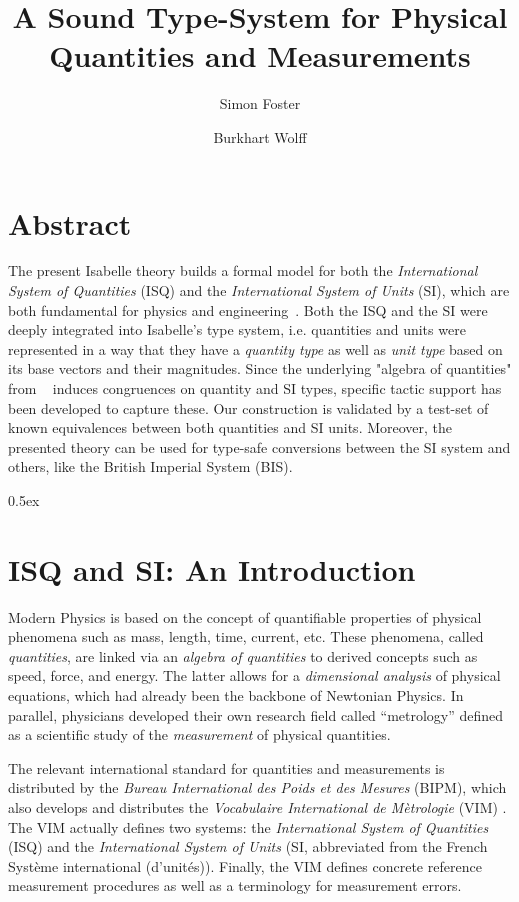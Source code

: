 \documentclass[11pt,a4paper]{book}
\begin{document}
\title{A Sound Type-System for Physical Quantities and Measurements}
\author{Simon Foster \and Burkhart Wolff}
\maketitle

\chapter*{Abstract}
The present Isabelle theory builds a formal model for both the \emph{International System of Quantities}
(ISQ) and the \emph{International System of Units} (SI), which are both fundamental for physics
and engineering~\cite{bipm-jcgm:2012:VIM}. Both the ISQ and the SI were deeply integrated into 
Isabelle's type system, i.e. quantities and units were represented in a way that 
they have a  \emph{quantity type} as well as \emph{unit type} based on its base vectors and their 
magnitudes. Since the underlying "algebra of quantities" from ~\cite{bipm-jcgm:2012:VIM} induces 
congruences on  quantity and SI types, specific tactic support has been developed to capture these.
Our construction is validated by a test-set of known equivalences between both quantities and SI units.
Moreover, the presented theory can be used for type-safe conversions between the SI system and
others, like the British Imperial System (BIS).

\tableofcontents

\parindent 0pt\parskip 0.5ex


\chapter{ISQ and SI: An Introduction}

Modern Physics is based on the concept of quantifiable properties of physical phenomena such 
as mass, length, time, current, etc. These phenomena, called \emph{quantities}, are linked via an 
\emph{algebra of quantities} to derived concepts such as speed, force, and energy. The latter 
allows for a \emph{dimensional analysis} of physical equations, which had already been the 
backbone of Newtonian Physics. In parallel, physicians developed their own research field called 
``metrology'' defined as a scientific study of the \emph{measurement} of physical quantities.


The relevant international standard for quantities and measurements is distributed by the
\emph{Bureau International des Poids et des Mesures} (BIPM), which also develops and distributes
the \emph{Vocabulaire International de M\`etrologie} (VIM) \cite{bipm-jcgm:2012:VIM}.
The VIM actually defines two systems: the \emph{International System of Quantities}
(ISQ) and the \emph{International System of Units} (SI, abbreviated from the French  Syst\`eme 
international (d’unit\'es)). Finally, the VIM defines concrete reference measurement procedures 
as well as a terminology for measurement errors. 
\end{document}

